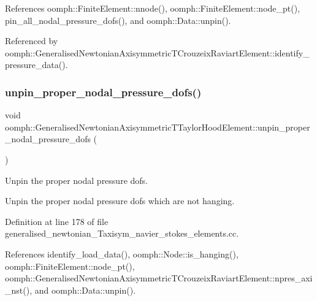 References oomph\+::\+Finite\+Element\+::nnode(), oomph\+::\+Finite\+Element\+::node\+\_\+pt(), pin\+\_\+all\+\_\+nodal\+\_\+pressure\+\_\+dofs(), and oomph\+::\+Data\+::unpin().



Referenced by oomph\+::\+Generalised\+Newtonian\+Axisymmetric\+T\+Crouzeix\+Raviart\+Element\+::identify\+\_\+pressure\+\_\+data().

\mbox{\label{classoomph_1_1GeneralisedNewtonianAxisymmetricTTaylorHoodElement_a74cb6b4598adf749f1011ed88f7a7455}} 
\subsubsection{\texorpdfstring{unpin\+\_\+proper\+\_\+nodal\+\_\+pressure\+\_\+dofs()}{unpin\_proper\_nodal\_pressure\_dofs()}}
{\footnotesize\ttfamily void oomph\+::\+Generalised\+Newtonian\+Axisymmetric\+T\+Taylor\+Hood\+Element\+::unpin\+\_\+proper\+\_\+nodal\+\_\+pressure\+\_\+dofs (\begin{DoxyParamCaption}{ }\end{DoxyParamCaption})\hspace{0.3cm}{\ttfamily [protected]}}



Unpin the proper nodal pressure dofs. 

Unpin the proper nodal pressure dofs which are not hanging. 

Definition at line 178 of file generalised\+\_\+newtonian\+\_\+\+Taxisym\+\_\+navier\+\_\+stokes\+\_\+elements.\+cc.



References identify\+\_\+load\+\_\+data(), oomph\+::\+Node\+::is\+\_\+hanging(), oomph\+::\+Finite\+Element\+::node\+\_\+pt(), oomph\+::\+Generalised\+Newtonian\+Axisymmetric\+T\+Crouzeix\+Raviart\+Element\+::npres\+\_\+axi\+\_\+nst(), and oomph\+::\+Data\+::unpin().



